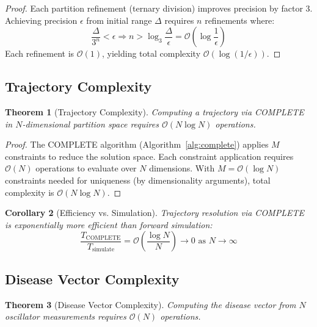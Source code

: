 \documentclass[10pt,twocolumn]{article}
\theoremstyle{plain}
\newtheorem{theorem}{Theorem}[section]
\newtheorem{corollary}[theorem]{Corollary}
\theoremstyle{definition}
\theoremstyle{remark}
\newcommand{\bigO}{\mathcal{O}}
\begin{document}
\begin{proof}
Each partition refinement (ternary division) improves precision by factor 3. Achieving precision $\epsilon$ from initial range $\Delta$ requires $n$ refinements where:
\begin{equation}
\frac{\Delta}{3^n} < \epsilon \Rightarrow n > \log_3\frac{\Delta}{\epsilon} = \bigO\left(\log\frac{1}{\epsilon}\right)
\end{equation}
Each refinement is $\bigO(1)$, yielding total complexity $\bigO(\log(1/\epsilon))$.
\end{proof}

\subsection{Trajectory Complexity}

\begin{theorem}[Trajectory Complexity]
\label{thm:trajectory_complexity}
Computing a trajectory via COMPLETE in $N$-dimensional partition space requires $\bigO(N \log N)$ operations.
\end{theorem}

\begin{proof}
The COMPLETE algorithm (Algorithm~\ref{alg:complete}) applies $M$ constraints to reduce the solution space. Each constraint application requires $\bigO(N)$ operations to evaluate over $N$ dimensions. With $M = \bigO(\log N)$ constraints needed for uniqueness (by dimensionality arguments), total complexity is $\bigO(N \log N)$.
\end{proof}

\begin{corollary}[Efficiency vs. Simulation]
\label{cor:efficiency}
Trajectory resolution via COMPLETE is exponentially more efficient than forward simulation:
\begin{equation}
\frac{T_{\mathrm{COMPLETE}}}{T_{\mathrm{simulate}}} = \bigO\left(\frac{\log N}{N}\right) \to 0 \text{ as } N \to \infty
\end{equation}
\end{corollary}

\subsection{Disease Vector Complexity}

\begin{theorem}[Disease Vector Complexity]
\label{thm:disease_complexity}
Computing the disease vector from $N$ oscillator measurements requires $\bigO(N)$ operations.
\end{theorem}
\end{document}
